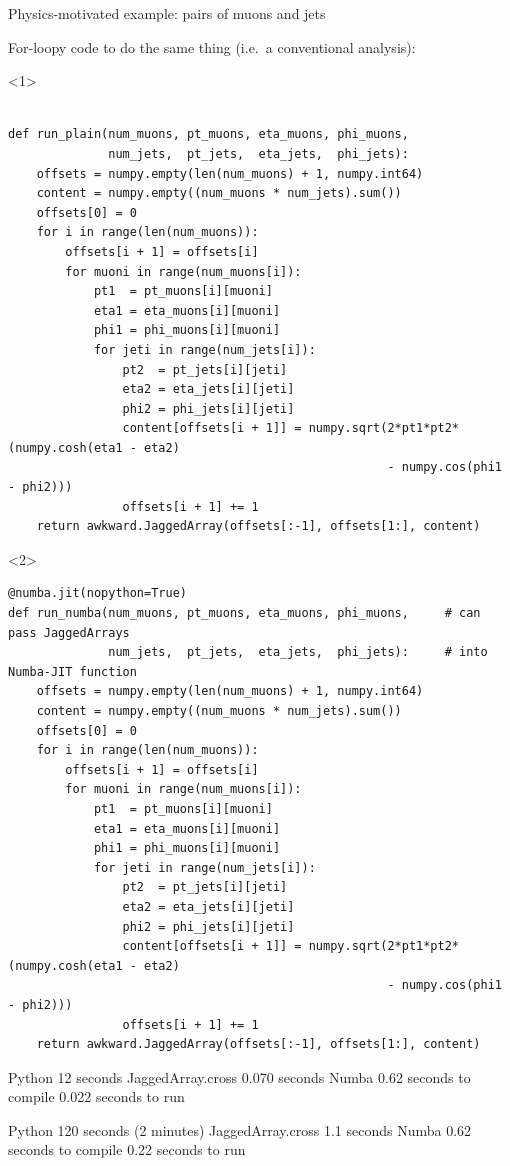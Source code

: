 \documentclass[aspectratio=169]{beamer}
\begin{document}
\begin{frame}[fragile]{Physics-motivated example: pairs of muons and jets}
\vspace{0.25 cm}

{For-loopy code to do the same thing (i.e.\ a conventional analysis):}

\scriptsize
\begin{onlyenv}<1>
\begin{verbatim}

def run_plain(num_muons, pt_muons, eta_muons, phi_muons,
              num_jets,  pt_jets,  eta_jets,  phi_jets):
    offsets = numpy.empty(len(num_muons) + 1, numpy.int64)
    content = numpy.empty((num_muons * num_jets).sum())
    offsets[0] = 0
    for i in range(len(num_muons)):
        offsets[i + 1] = offsets[i]
        for muoni in range(num_muons[i]):
            pt1  = pt_muons[i][muoni]
            eta1 = eta_muons[i][muoni]
            phi1 = phi_muons[i][muoni]
            for jeti in range(num_jets[i]):
                pt2  = pt_jets[i][jeti]
                eta2 = eta_jets[i][jeti]
                phi2 = phi_jets[i][jeti]
                content[offsets[i + 1]] = numpy.sqrt(2*pt1*pt2*(numpy.cosh(eta1 - eta2)
                                                     - numpy.cos(phi1 - phi2)))
                offsets[i + 1] += 1
    return awkward.JaggedArray(offsets[:-1], offsets[1:], content)
\end{verbatim}
\end{onlyenv}
\begin{onlyenv}<2>
\begin{verbatim}
@numba.jit(nopython=True)
def run_numba(num_muons, pt_muons, eta_muons, phi_muons,     # can pass JaggedArrays
              num_jets,  pt_jets,  eta_jets,  phi_jets):     # into Numba-JIT function
    offsets = numpy.empty(len(num_muons) + 1, numpy.int64)
    content = numpy.empty((num_muons * num_jets).sum())
    offsets[0] = 0
    for i in range(len(num_muons)):
        offsets[i + 1] = offsets[i]
        for muoni in range(num_muons[i]):
            pt1  = pt_muons[i][muoni]
            eta1 = eta_muons[i][muoni]
            phi1 = phi_muons[i][muoni]
            for jeti in range(num_jets[i]):
                pt2  = pt_jets[i][jeti]
                eta2 = eta_jets[i][jeti]
                phi2 = phi_jets[i][jeti]
                content[offsets[i + 1]] = numpy.sqrt(2*pt1*pt2*(numpy.cosh(eta1 - eta2)
                                                     - numpy.cos(phi1 - phi2)))
                offsets[i + 1] += 1
    return awkward.JaggedArray(offsets[:-1], offsets[1:], content)
\end{verbatim}
\end{onlyenv}
\end{frame}

\begin{frame}{}
Python 12 seconds
JaggedArray.cross 0.070 seconds
Numba 0.62 seconds to compile
      0.022 seconds to run

Python 120 seconds (2 minutes)
JaggedArray.cross 1.1 seconds
Numba 0.62 seconds to compile
      0.22 seconds to run
\end{frame}
\end{document}
